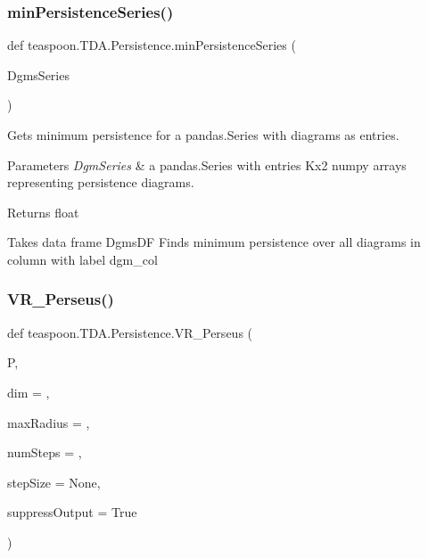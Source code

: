 \subsubsection{\texorpdfstring{min\+Persistence\+Series()}{minPersistenceSeries()}}
{\footnotesize\ttfamily def teaspoon.\+T\+D\+A.\+Persistence.\+min\+Persistence\+Series (\begin{DoxyParamCaption}\item[{}]{Dgms\+Series }\end{DoxyParamCaption})}



Gets minimum persistence for a pandas.\+Series with diagrams as entries.


\begin{DoxyParams}{Parameters}
{\em Dgm\+Series} & a pandas.\+Series with entries Kx2 numpy arrays representing persistence diagrams.\\
\hline
\end{DoxyParams}
\begin{DoxyReturn}{Returns}
float \begin{DoxyVerb}Takes data frame DgmsDF
Finds minimum persistence over all diagrams in
column with label dgm_col
\end{DoxyVerb}

\end{DoxyReturn}
\mbox{\label{namespaceteaspoon_1_1_t_d_a_1_1_persistence_ae3954f45636c5f88b8e7cb7b422eea3d}}
\subsubsection{\texorpdfstring{V\+R\+\_\+\+Perseus()}{VR\_Perseus()}}
{\footnotesize\ttfamily def teaspoon.\+T\+D\+A.\+Persistence.\+V\+R\+\_\+\+Perseus (\begin{DoxyParamCaption}\item[{}]{P,  }\item[{}]{dim = {},  }\item[{}]{max\+Radius = {},  }\item[{}]{num\+Steps = {},  }\item[{}]{step\+Size = {\ttfamily None},  }\item[{}]{suppress\+Output = {\ttfamily True} }\end{DoxyParamCaption})}



